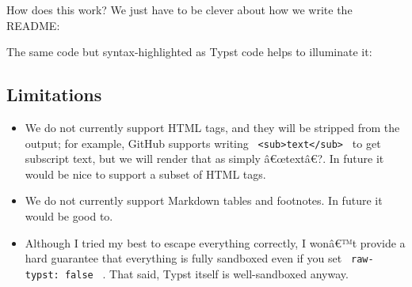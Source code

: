 How does this work? We just have to be clever about how we write the
README:

\begin{Shaded}
\begin{Highlighting}[]



\end{Highlighting}
\end{Shaded}

The same code but syntax-highlighted as Typst code helps to illuminate
it:

\begin{Shaded}
\begin{Highlighting}[]
\NormalTok{/*{-}{-}\textgreater{}}


\NormalTok{\textless{}!{-}{-}*///{-}{-}\textgreater{}}
\end{Highlighting}
\end{Shaded}

\subsection{Limitations}\label{limitations}

\begin{itemize}
\tightlist
\item
  We do not currently support HTML tags, and they will be stripped from
  the output; for example, GitHub supports writing
  \texttt{\ \textless{}sub\textgreater{}text\textless{}/sub\textgreater{}\ }
  to get subscript text, but we will render that as simply â€œtextâ€?.
  In future it would be nice to support a subset of HTML tags.
\item
  We do not currently support Markdown tables and footnotes. In future
  it would be good to.
\item
  Although I tried my best to escape everything correctly, I wonâ€™t
  provide a hard guarantee that everything is fully sandboxed even if
  you set \texttt{\ raw-typst:\ false\ } . That said, Typst itself is
  well-sandboxed anyway.
\end{itemize}

